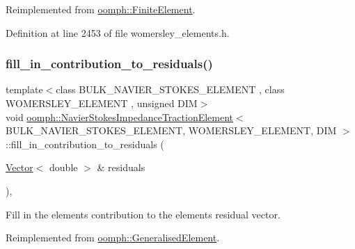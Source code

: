 Reimplemented from \hyperlink{classoomph_1_1FiniteElement_a0ae7af222af38a0d53bf283dc85bdfea}{oomph\+::\+Finite\+Element}.



Definition at line 2453 of file womersley\+\_\+elements.\+h.

\mbox{\label{classoomph_1_1NavierStokesImpedanceTractionElement_a59864479b537aae999dceaa38e8856ef}} 
\subsubsection{\texorpdfstring{fill\+\_\+in\+\_\+contribution\+\_\+to\+\_\+residuals()}{fill\_in\_contribution\_to\_residuals()}}
{\footnotesize\ttfamily template$<$class B\+U\+L\+K\+\_\+\+N\+A\+V\+I\+E\+R\+\_\+\+S\+T\+O\+K\+E\+S\+\_\+\+E\+L\+E\+M\+E\+NT , class W\+O\+M\+E\+R\+S\+L\+E\+Y\+\_\+\+E\+L\+E\+M\+E\+NT , unsigned D\+IM$>$ \\
void \hyperlink{classoomph_1_1NavierStokesImpedanceTractionElement}{oomph\+::\+Navier\+Stokes\+Impedance\+Traction\+Element}$<$ B\+U\+L\+K\+\_\+\+N\+A\+V\+I\+E\+R\+\_\+\+S\+T\+O\+K\+E\+S\+\_\+\+E\+L\+E\+M\+E\+NT, W\+O\+M\+E\+R\+S\+L\+E\+Y\+\_\+\+E\+L\+E\+M\+E\+NT, D\+IM $>$\+::fill\+\_\+in\+\_\+contribution\+\_\+to\+\_\+residuals (\begin{DoxyParamCaption}\item[{\hyperlink{classoomph_1_1Vector}{Vector}$<$ double $>$ \&}]{residuals }\end{DoxyParamCaption})\hspace{0.3cm}{\ttfamily [inline]}, {\ttfamily [virtual]}}



Fill in the element\textquotesingle{}s contribution to the element\textquotesingle{}s residual vector. 



Reimplemented from \hyperlink{classoomph_1_1GeneralisedElement_a310c97f515e8504a48179c0e72c550d7}{oomph\+::\+Generalised\+Element}.



